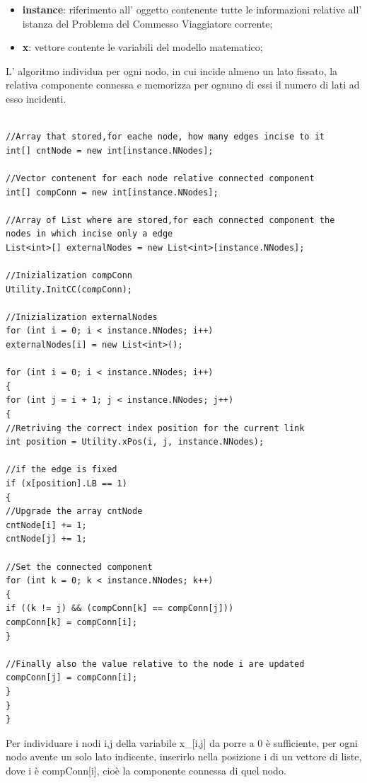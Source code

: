 \documentclass[11pt]{article}
\begin{document}
\begin{itemize}
    \item \textbf{instance}: riferimento all' oggetto contenente tutte le informazioni relative all' istanza del Problema del Commesso Viaggiatore corrente;
    \item \textbf{x}: vettore contente le variabili del modello matematico;
\end{itemize}

L' algoritmo individua per ogni nodo, in cui incide almeno un lato fissato, la relativa componente connessa e memorizza per ognuno di essi il numero di lati ad esso incidenti. 

\begin{lstlisting} 

//Array that stored,for eache node, how many edges incise to it 
int[] cntNode = new int[instance.NNodes];

//Vector contenent for each node relative connected component
int[] compConn = new int[instance.NNodes];

//Array of List where are stored,for each connected component the nodes in which incise only a edge
List<int>[] externalNodes = new List<int>[instance.NNodes];

//Inizialization compConn
Utility.InitCC(compConn);

//Inizialization externalNodes
for (int i = 0; i < instance.NNodes; i++)
externalNodes[i] = new List<int>();

for (int i = 0; i < instance.NNodes; i++)
{
for (int j = i + 1; j < instance.NNodes; j++)
{
//Retriving the correct index position for the current link 
int position = Utility.xPos(i, j, instance.NNodes);

//if the edge is fixed 
if (x[position].LB == 1)
{
//Upgrade the array cntNode
cntNode[i] += 1;
cntNode[j] += 1;

//Set the connected component 
for (int k = 0; k < instance.NNodes; k++)
{
if ((k != j) && (compConn[k] == compConn[j]))
compConn[k] = compConn[i];                          
}

//Finally also the value relative to the node i are updated
compConn[j] = compConn[i];                                                                        
}
}
}
\end{lstlisting}

Per individuare i nodi i,j della variabile x_[i,j] da porre a 0 è sufficiente, per ogni nodo avente un solo lato indicente, inserirlo nella posizione i di un vettore di liste, dove i è compConn[i], cioè la componente connessa di quel nodo.
\end{document}

